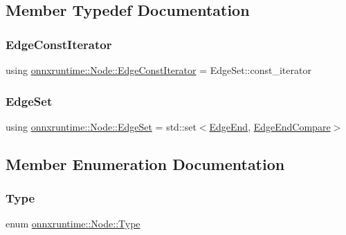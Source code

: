 \subsection{Member Typedef Documentation}
\mbox{\label{classonnxruntime_1_1Node_ae0df52e26b0237505b6a0cbc25106d9d}} 
\subsubsection{\texorpdfstring{Edge\+Const\+Iterator}{EdgeConstIterator}}
{\footnotesize\ttfamily using \mbox{\hyperlink{classonnxruntime_1_1Node_ae0df52e26b0237505b6a0cbc25106d9d}{onnxruntime\+::\+Node\+::\+Edge\+Const\+Iterator}} =  Edge\+Set\+::const\+\_\+iterator}

\mbox{\label{classonnxruntime_1_1Node_a96c203b69f604fcbe80532f9d939dcc6}} 
\subsubsection{\texorpdfstring{Edge\+Set}{EdgeSet}}
{\footnotesize\ttfamily using \mbox{\hyperlink{classonnxruntime_1_1Node_a96c203b69f604fcbe80532f9d939dcc6}{onnxruntime\+::\+Node\+::\+Edge\+Set}} =  std\+::set$<$\mbox{\hyperlink{classonnxruntime_1_1Node_1_1EdgeEnd}{Edge\+End}}, \mbox{\hyperlink{structonnxruntime_1_1Node_1_1EdgeEndCompare}{Edge\+End\+Compare}}$>$}



\subsection{Member Enumeration Documentation}
\mbox{\label{classonnxruntime_1_1Node_a2d9625711aecc66f9b9373d61f794f6a}} 
\subsubsection{\texorpdfstring{Type}{Type}}
{\footnotesize\ttfamily enum \mbox{\hyperlink{classonnxruntime_1_1Node_a2d9625711aecc66f9b9373d61f794f6a}{onnxruntime\+::\+Node\+::\+Type}}\hspace{0.3cm}{\ttfamily [strong]}}


